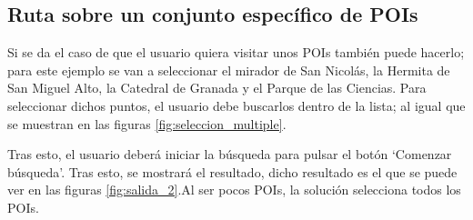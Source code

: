 \subsection[Caso 2]{Ruta sobre un conjunto específico de POIs}
Si se da el caso de que el usuario quiera visitar unos POIs también puede hacerlo; para este ejemplo se van a seleccionar el mirador de San Nicolás, la Hermita de San Miguel Alto, la Catedral de Granada y el Parque de las Ciencias. Para seleccionar dichos puntos, el usuario debe buscarlos dentro de la lista; al igual que se muestran en las figuras \ref{fig:seleccion_multiple}.\newline

Tras esto, el usuario deberá iniciar la búsqueda para pulsar el botón \enquote*{Comenzar búsqueda}. Tras esto, se mostrará el resultado, dicho resultado es el que se puede ver en las figuras \ref{fig:salida_2}.Al ser pocos POIs, la solución selecciona todos los POIs.\newline


